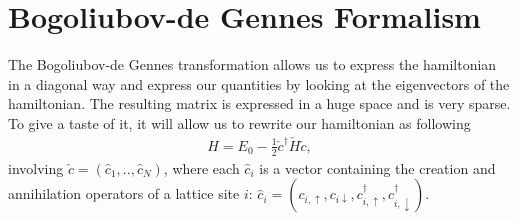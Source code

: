 \documentclass[../main.tex]{subfile}
\begin{document}
\section{Bogoliubov-de Gennes Formalism}
The Bogoliubov-de Gennes transformation allows us to express the hamiltonian in a diagonal way and express our quantities 
by looking at the eigenvectors of the hamiltonian. The resulting matrix is expressed in a huge space and is very sparse.\\

To give a taste of it, it will allow us to rewrite our hamiltonian as following
\begin{align}
    H = E_0 - \frac{1}{2} \check{c}^\dagger \check{H} \check{c}, \label{eq:BdG_intro_H}
\end{align}
involving $\check{c} = (\hat{c}_1,..,\hat{c}_N)$, where each $\hat{c}_i$ is a
 vector containing the creation and annihilation operators of a lattice site $i$:
$\hat{c}_i = (c_{i,\uparrow} ,c_{i\downarrow}, c_{i,\uparrow}^{\dagger} ,c_{i,\downarrow}^{\dagger})$.\\
\end{document}
